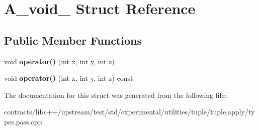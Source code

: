 \hypertarget{struct_a__void__3}{}\section{A\+\_\+void\+\_ Struct Reference}
\label{struct_a__void__3}
\subsection*{Public Member Functions}
\begin{DoxyCompactItemize}
\item 
\mbox{\label{struct_a__void__3_ab56044a94f4526f701d0de0a10f521de}} 
void {\bfseries operator()} (int x, int y, int z)
\item 
\mbox{\label{struct_a__void__3_aee26590ae8e7e5923b75f6e5887ad34d}} 
void {\bfseries operator()} (int x, int y, int z) const
\end{DoxyCompactItemize}


The documentation for this struct was generated from the following file\+:\begin{DoxyCompactItemize}
\item 
contracts/libc++/upstream/test/std/experimental/utilities/tuple/tuple.\+apply/types.\+pass.\+cpp\end{DoxyCompactItemize}

